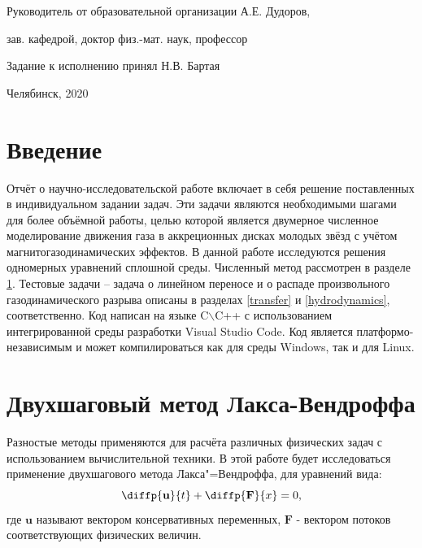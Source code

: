 \documentclass[a4paper]{article}
\begin{document}
\begin{titlepage}
	Руководитель от образовательной организации \enspace\hrulefill \hspace{0.2cm} А.Е. Дудоров,
	
	зав. кафедрой, доктор физ.-мат. наук, профессор \vspace{3pt}
	
	Задание к исполнению принял \enspace\hrulefill \hspace{0.2cm} Н.В. Бартая
	
	
	\vfill
	\begin{center}
		Челябинск, 2020	
	\end{center}
\end{titlepage}
\restoregeometry	

\tableofcontents
\setcounter{page}{3}
\newpage

	\section*{Введение}
	Отчёт о научно-исследовательской работе включает в себя решение поставленных в индивидуальном задании задач. Эти задачи являются необходимыми шагами для более объёмной работы, целью которой является двумерное численное моделирование движения газа в аккреционных дисках молодых звёзд с учётом магнитогазодинамических эффектов. В данной работе исследуются решения одномерных уравнений сплошной среды. Численный метод рассмотрен в разделе \ref{Lax-Wendroff}. Тестовые задачи -- задача о линейном переносе и о распаде произвольного газодинамического разрыва описаны в разделах \ref{transfer} и \ref{hydrodynamics}, соответственно. Код написан на языке C$\backslash$C++ с использованием интегрированной среды разработки Visual Studio Code. Код является платформо-независимым и может компилироваться как для среды Windows, так и для Linux.
	
	\section{Двухшаговый метод Лакса-Вендроффа}\label{Lax-Wendroff}
	Разностые методы применяются для расчёта различных физических задач с использованием вычислительной техники. В этой работе будет исследоваться применение двухшагового метода Лакса"=Вендроффа, для уравнений вида: 
	\begin{equation}\label{dudt}
	\diffp{\mathbf{u}}{t} + \diffp{\mathbf{F}}{x} = 0 ,
	\end{equation}
	где $\mathbf{u}$ называют вектором консервативных переменных, $\mathbf{F}$ - вектором потоков соответствующих физических величин.
	
\end{document}
